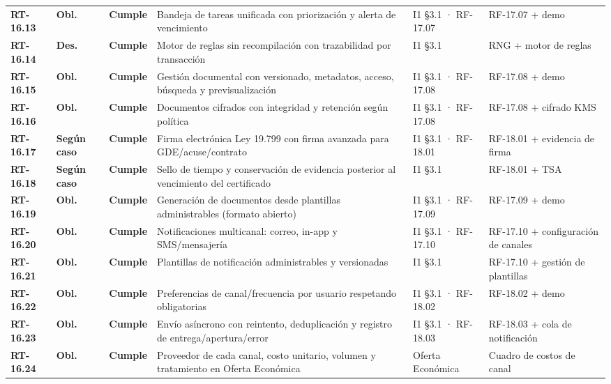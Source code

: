 \begin{small}
\begin{longtable}{@{}p{1.35cm} p{1.15cm} p{1.15cm} p{4.6cm} p{2.35cm} p{3.8cm}@{}}
\textbf{RT-16.13} & \textbf{Obl.} & \textbf{Cumple} & Bandeja de tareas unificada con priorizaci\'on y alerta de vencimiento & I1 §3.1 · RF-17.07 & RF-17.07 + demo \\
\textbf{RT-16.14} & \textbf{Des.} & \textbf{Cumple} & Motor de reglas sin recompilaci\'on con trazabilidad por transacci\'on & I1 §3.1 & RNG + motor de reglas \\
\textbf{RT-16.15} & \textbf{Obl.} & \textbf{Cumple} & Gesti\'on documental con versionado, metadatos, acceso, b\'usqueda y previsualizaci\'on & I1 §3.1 · RF-17.08 & RF-17.08 + demo \\
\textbf{RT-16.16} & \textbf{Obl.} & \textbf{Cumple} & Documentos cifrados con integridad y retenci\'on seg\'un pol\'itica & I1 §3.1 · RF-17.08 & RF-17.08 + cifrado KMS \\
\textbf{RT-16.17} & \textbf{Según caso} & \textbf{Cumple} & Firma electr\'onica Ley 19.799 con firma avanzada para GDE/acuse/contrato & I1 §3.1 · RF-18.01 & RF-18.01 + evidencia de firma \\
\textbf{RT-16.18} & \textbf{Según caso} & \textbf{Cumple} & Sello de tiempo y conservaci\'on de evidencia posterior al vencimiento del certificado & I1 §3.1 & RF-18.01 + TSA \\
\textbf{RT-16.19} & \textbf{Obl.} & \textbf{Cumple} & Generaci\'on de documentos desde plantillas administrables (formato abierto) & I1 §3.1 · RF-17.09 & RF-17.09 + demo \\
\textbf{RT-16.20} & \textbf{Obl.} & \textbf{Cumple} & Notificaciones multicanal: correo, in-app y SMS/mensajer\'ia & I1 §3.1 · RF-17.10 & RF-17.10 + configuraci\'on de canales \\
\textbf{RT-16.21} & \textbf{Obl.} & \textbf{Cumple} & Plantillas de notificaci\'on administrables y versionadas & I1 §3.1 & RF-17.10 + gesti\'on de plantillas \\
\textbf{RT-16.22} & \textbf{Obl.} & \textbf{Cumple} & Preferencias de canal/frecuencia por usuario respetando obligatorias & I1 §3.1 · RF-18.02 & RF-18.02 + demo \\
\textbf{RT-16.23} & \textbf{Obl.} & \textbf{Cumple} & Env\'io as\'incrono con reintento, deduplicaci\'on y registro de entrega/apertura/error & I1 §3.1 · RF-18.03 & RF-18.03 + cola de notificaci\'on \\
\textbf{RT-16.24} & \textbf{Obl.} & \textbf{Cumple} & Proveedor de cada canal, costo unitario, volumen y tratamiento en Oferta Econ\'omica & Oferta Econ\'omica & Cuadro de costos de canal \\

\end{longtable}
\end{small}
